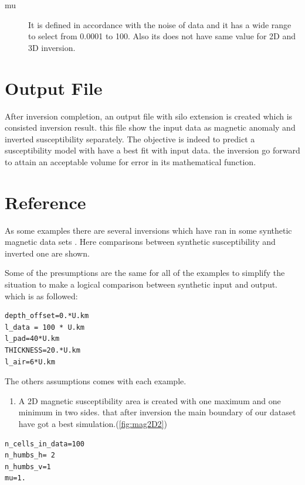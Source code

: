 \begin{description} 	

\item[mu]
It is defined in accordance with the noise of data and it has a wide range to select from 0.0001 to 100. Also its does not have same value for 2D and 3D inversion.

\end{description}

\section{Output File}

After inversion completion, an output file with silo extension is created which is consisted inversion result. this file show the input data as magnetic anomaly and inverted susceptibility separately. The objective is indeed to  predict a susceptibility model with have a best fit with input data. the inversion go forward to attain an acceptable volume for error in its mathematical function. 


\section{Reference}

As some examples there are several inversions which have ran in some synthetic magnetic data sets . Here comparisons between synthetic susceptibility and inverted one are shown.

Some of the presumptions are the same for all of the examples to simplify the situation to make a logical comparison between synthetic input and output. which is as followed:

\begin{verbatim}
depth_offset=0.*U.km
l_data = 100 * U.km
l_pad=40*U.km
THICKNESS=20.*U.km
l_air=6*U.km
\end{verbatim}

The others assumptions comes with each example.

\begin{enumerate}
\item A 2D magnetic susceptibility area is created with one maximum and one minimum in two sides. that after inversion the main boundary of our dataset  have got a best simulation.(\ref{fig:mag2D2}) 
\end{enumerate}
\begin{verbatim}
n_cells_in_data=100
n_humbs_h= 2
n_humbs_v=1
mu=1.
\end{verbatim}

